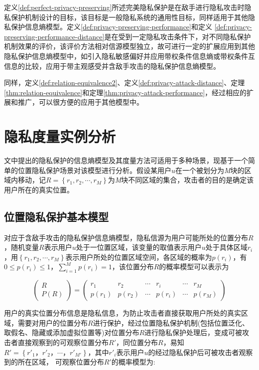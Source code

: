 定义\ref{def:perfect-privacy-preserving}所述完美隐私保护是在敌手进行隐私攻击时隐私保护机制设计的目标，该目标是一般隐私系统的通用性目标，同样适用于其他隐私保护信息熵模型。定义\ref{def:privacy-preserving-performance}和定义	\ref{def:privacy-preserving-performance-distance}是在受到一定隐私攻击条件下，对不同隐私保护机制效果的评价，该评价方法相对信源模型独立，故可进行一定的扩展应用到其他隐私保护信息熵模型中，如引入隐私敏感偏好并应用带权条件信息熵或带权条件互信息的比较，应用于带主观感受并含敌手攻击的隐私保护信息熵模型。

同样，定义\ref{def:relation-equivalence2}、定义\ref{def:privacy-attack-distance}、定理\ref{thm:relation-equivalence}和定理\ref{thm:privacy-attack-performance}，经过相应的扩展和推广，可以很方便的应用于其他模型中。

\section{隐私度量实例分析}\label{instance analysis}

文中提出的隐私保护的信息熵模型及其度量方法可适用于多种场景，现基于一个简单的位置隐私保护场景对该模型进行分析。假设某用户$u$在一个被划分为\textit{M}块的区域内移动，记$R=\left \{ r_{1},r_{2},\cdots,r_{M} \right \}$为\textit{M}块不同区域的集合，攻击者的目的是确定该用户所在的真实位置。
\subsection{位置隐私保护基本模型}
对应于含敌手攻击的隐私保护信息熵模型，隐私信源为用户可能所处的位置分布$R$，随机变量$R$表示用户$u$处于一位置区域，该变量的取值表示用户$u$处于具体区域$r_{i}$，用$\left \{ r_{1},r_{2},\cdots,r_{M} \right \}$表示用户所处的位置区域空间，各区域的概率为$p(r_{i})$，有$0\leqslant p(r_{i})\leqslant 1$，$\sum_{i=1}^{M}p(r_{i})=1$，该位置分布$R$的概率模型可以表示为

\begin{equation}
\begin{pmatrix}
R\\ 
P(R)
\end{pmatrix}=\begin{pmatrix}
r_{1} & r_{2} & \cdots  & r_{i} & \cdots  & r_{M}\\ 
p(r_{1})& p(r_{2}) & \cdots & p(r_{i}) & \cdots & p(r_{M})
\end{pmatrix}
\end{equation}

用户的真实位置分布信息是隐私信息，为防止攻击者直接获取用户所处的真实区域，需要对用户的位置分布$R$进行保护，经过位置隐私保护机制(包括位置泛化、取假名、隐藏或添加虚拟位置等)对位置分布$R$进行隐私保护处理后，变成可被攻击者直接观察到的可观察位置分布${R}'$，同位置分布$R$，易知${R}'=\left \{ {r}'_{1}，{r}'_{2}，\cdots ，{r}'_{{M}'} \right \}$，其中${r}'_{i}$表示用户$u$的经过隐私保护后可被攻击者观察到的所在区域， 可观察位置分布${R}'$的概率模型为:

